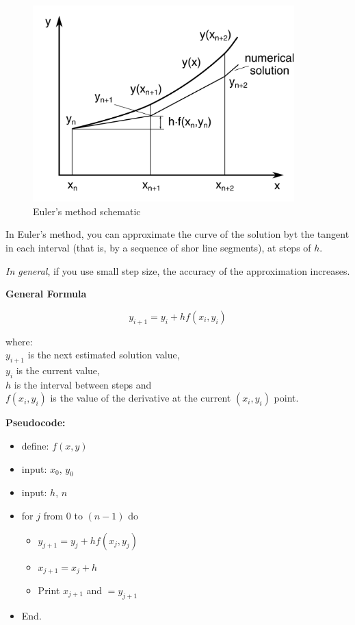 \begin{figure}[ht]
    \centering
    \includegraphics[width=0.90\textwidth]{img/Euler.png}
    \caption{Euler's method schematic}
    \label{fig:euler-png}
\end{figure}

In Euler's method, you can approximate the curve of the solution byt the tangent
in each interval (that is, by a sequence of shor line segments), at steps of $ h $.

\textit{In general}, if you use small step size, the accuracy of the approximation
increases.

\textbf{General Formula}

\begin{equation}
    y_{i+1} = y_i + h f(x_i,y_i)
\end{equation}

where:\\
$ y_{i+1} $ is the next estimated solution value,\\
$ y_i $ is the current value,\\
$ h $ is the interval between steps and\\
$ f(x_i,y_i) $ is the value of the derivative at the current $ (x_i,y_i) $ point.

\textbf{Pseudocode:}

\begin{itemize}
    \item define: $ f(x,y) $

    \item input: $ x_0 $, $ y_0 $

    \item input: $ h $, $ n $

    \item for $ j $ from $ 0 $ to $ (n-1) $ do
        \begin{itemize}
            \item $ y_{j+1} = y_j + hf(x_j, y_j) $
            \item $ x_{j+1} = x_j + h $
            \item Print $ x_{j+1} $ and $= y_{j+1} $
        \end{itemize}
    \item End.
\end{itemize}


